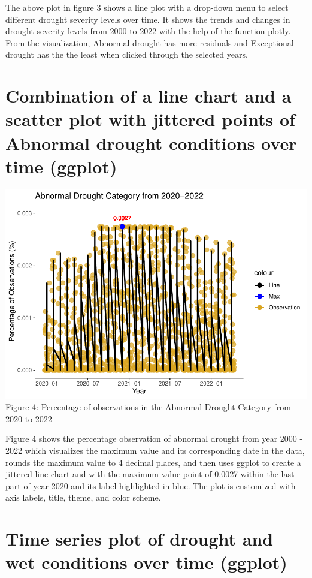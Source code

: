 \documentclass[
]{article}
\begin{document}
The above plot in figure 3 shows a line plot with a drop-down menu to
select different drought severity levels over time. It shows the trends
and changes in drought severity levels from 2000 to 2022 with the help
of the function plotly. From the visualization, Abnormal drought has
more residuals and Exceptional drought has the the least when clicked
through the selected years.

\hypertarget{combination-of-a-line-chart-and-a-scatter-plot-with-jittered-points-of-abnormal-drought-conditions-over-time-ggplot}{%
\section{Combination of a line chart and a scatter plot with jittered
points of Abnormal drought conditions over time
(ggplot)}\label{combination-of-a-line-chart-and-a-scatter-plot-with-jittered-points-of-abnormal-drought-conditions-over-time-ggplot}}

\includegraphics{C7083-213221-Markdown_files/figure-latex/line plot with jittered points-1.pdf}
Figure 4: Percentage of observations in the Abnormal Drought Category
from 2020 to 2022

Figure 4 shows the percentage observation of abnormal drought from year
2000 - 2022 which visualizes the maximum value and its corresponding
date in the data, rounds the maximum value to 4 decimal places, and then
uses ggplot to create a jittered line chart and with the maximum value
point of 0.0027 within the last part of year 2020 and its label
highlighted in blue. The plot is customized with axis labels, title,
theme, and color scheme.

\hypertarget{time-series-plot-of-drought-and-wet-conditions-over-time-ggplot}{%
\section{Time series plot of drought and wet conditions over time
(ggplot)}\label{time-series-plot-of-drought-and-wet-conditions-over-time-ggplot}}
\end{document}
